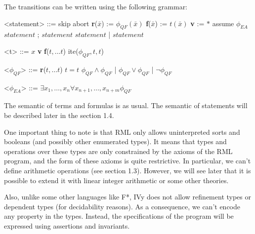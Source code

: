 \documentclass[11pt,a4paper,oldfontcommands]{memoir}
\begin{document}
    The transitions can be written using the following grammar:
    \begin{multicols}{2}
        \begin{grammar}

            <statement> ::= skip
            \alt abort
            \alt \textbf{r}(\(\bar{x}\)) := \( \phi_{QF}(\bar{x}) \)
            \alt \textbf{f}(\(\bar{x}\)) := \( t(\bar{x}) \)
            \alt \textbf{v} := \( * \)
            \alt assume \( \phi_{EA} \)
            \alt \( statement \) ; \( statement \)
            \alt \( statement \) | \( statement \)
            
        \end{grammar}

        \columnbreak

        \begin{grammar}

            <t> ::= \(x\)
            \alt \textbf{v}
            \alt \textbf{f}(\(t,...t\))
            \alt ite(\( \phi_{QF},t,t\))

            <\( \phi_{QF} \)> ::= \textbf{r}(\(t,\ldots t\))
            \alt \( t = t \)
            \alt \( \phi_{QF} \land \phi_{QF} \) \quad | \quad \( \phi_{QF} \lor \phi_{QF} \) \quad | \quad \( \neg \phi_{QF} \)
            
            <\( \phi_{EA} \)> ::= \( \exists x_1,\ldots,x_n \forall x_{n+1},\ldots,x_{n+m} \phi_{QF} \)

        \end{grammar}
    \end{multicols}

    The semantic of terms and formulas is as usual. The semantic of statements will be described later in the section 1.4.

    One important thing to note is that RML only allows uninterpreted sorts and booleans (and possibly other enumerated types).
    It means that types and operations over these types are only constrained by the axioms of the RML program,
    and the form of these axioms is quite restrictive.
    In particular, we can't define arithmetic operations (see section 1.3).
    However, we will see later that it is possible to extend it with linear integer arithmetic or some other theories.

    Also, unlike some other languages like F*, IVy does not allow refinement types or dependent types (for decidability reasons).
    As a consequence, we can't encode any property in the types.
    Instead, the specifications of the program will be expressed using assertions and invariants.
\end{document}
